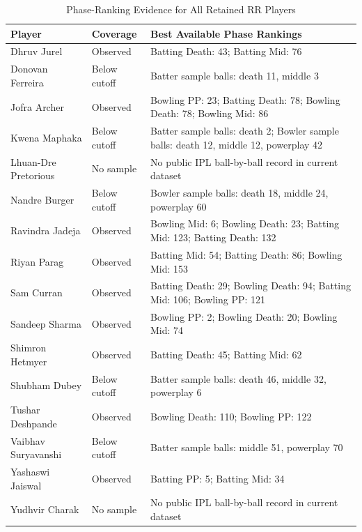 \begin{table}[H]
\centering
\caption{Phase-Ranking Evidence for All Retained RR Players}
\begin{tabular}{p{3.1cm}p{1.6cm}p{8.2cm}}
\toprule
Player & Coverage & Best Available Phase Rankings \\
\midrule
Dhruv Jurel & Observed & Batting Death: 43; Batting Mid: 76 \\
Donovan Ferreira & Below cutoff & Batter sample balls: death 11, middle 3 \\
Jofra Archer & Observed & Bowling PP: 23; Batting Death: 78; Bowling Death: 78; Bowling Mid: 86 \\
Kwena Maphaka & Below cutoff & Batter sample balls: death 2; Bowler sample balls: death 12, middle 12, powerplay 42 \\
Lhuan-Dre Pretorious & No sample & No public IPL ball-by-ball record in current dataset \\
Nandre Burger & Below cutoff & Bowler sample balls: death 18, middle 24, powerplay 60 \\
Ravindra Jadeja & Observed & Bowling Mid: 6; Bowling Death: 23; Batting Mid: 123; Batting Death: 132 \\
Riyan Parag & Observed & Batting Mid: 54; Batting Death: 86; Bowling Mid: 153 \\
Sam Curran & Observed & Batting Death: 29; Bowling Death: 94; Batting Mid: 106; Bowling PP: 121 \\
Sandeep Sharma & Observed & Bowling PP: 2; Bowling Death: 20; Bowling Mid: 74 \\
Shimron Hetmyer & Observed & Batting Death: 45; Batting Mid: 62 \\
Shubham Dubey & Below cutoff & Batter sample balls: death 46, middle 32, powerplay 6 \\
Tushar Deshpande & Observed & Bowling Death: 110; Bowling PP: 122 \\
Vaibhav Suryavanshi & Below cutoff & Batter sample balls: middle 51, powerplay 70 \\
Yashaswi Jaiswal & Observed & Batting PP: 5; Batting Mid: 34 \\
Yudhvir Charak & No sample & No public IPL ball-by-ball record in current dataset \\
\bottomrule
\end{tabular}
\end{table}
